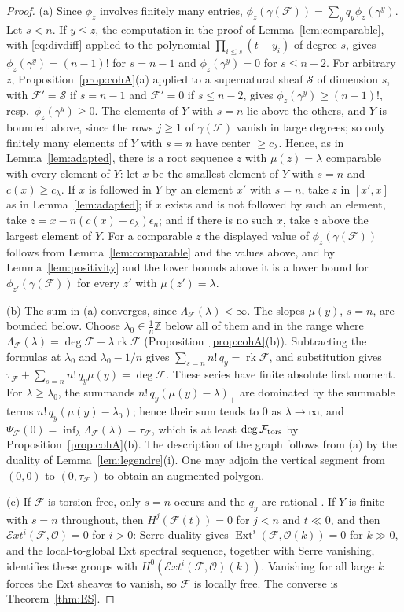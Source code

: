 \documentclass[11pt]{amsart}
\theoremstyle{definition}
\theoremstyle{remark}
\newcommand{\ZZ}{\mathbb{Z}}
\newcommand{\OO}{\mathcal{O}}
\newcommand{\cF}{\mathcal{F}}
\DeclareMathOperator{\rk}{rk}
\begin{document}
\begin{proof}
(a) Since $\phi_z$ involves finitely many entries, $\phi_z(\gamma(\cF))=\sum_yq_y\phi_z(\gamma^y)$. Let $s<n$. If $y\le z$, the computation in the proof of Lemma~\ref{lem:comparable}, with \eqref{eq:divdiff} applied to the polynomial $\prod_{i\le s}(t-y_i)$ of degree $s$, gives $\phi_z(\gamma^y)=(n-1)!$ for $s=n-1$ and $\phi_z(\gamma^y)=0$ for $s\le n-2$. For arbitrary $z$, Proposition~\ref{prop:cohA}(a) applied to a supernatural sheaf $\mathcal S$ of dimension $s$, with $\cF'=\mathcal S$ if $s=n-1$ and $\cF'=0$ if $s\le n-2$, gives $\phi_z(\gamma^y)\ge(n-1)!$, resp.\ $\phi_z(\gamma^y)\ge0$. The elements of $Y$ with $s=n$ lie above the others, and $Y$ is bounded above, since the rows $j\ge1$ of $\gamma(\cF)$ vanish in large degrees; so only finitely many elements of $Y$ with $s=n$ have center $\ge c_\lambda$. Hence, as in Lemma~\ref{lem:adapted}, there is a root sequence $z$ with $\mu(z)=\lambda$ comparable with every element of $Y$: let $x$ be the smallest element of $Y$ with $s=n$ and $c(x)\ge c_\lambda$. If $x$ is followed in $Y$ by an element $x'$ with $s=n$, take $z$ in $[x',x]$ as in Lemma~\ref{lem:adapted}; if $x$ exists and is not followed by such an element, take $z=x-n(c(x)-c_\lambda)\epsilon_n$; and if there is no such $x$, take $z$ above the largest element of $Y$. For a comparable $z$ the displayed value of $\phi_z(\gamma(\cF))$ follows from Lemma~\ref{lem:comparable} and the values above, and by Lemma~\ref{lem:positivity} and the lower bounds above it is a lower bound for $\phi_{z'}(\gamma(\cF))$ for every $z'$ with $\mu(z')=\lambda$.

(b) The sum in (a) converges, since $\Lambda_\cF(\lambda)<\infty$. The slopes $\mu(y)$, $s=n$, are bounded below. Choose $\lambda_0\in\frac1n\ZZ$ below all of them and in the range where $\Lambda_\cF(\lambda)=\deg\cF-\lambda\rk\cF$ (Proposition~\ref{prop:cohA}(b)). Subtracting the formulas at $\lambda_0$ and $\lambda_0-1/n$ gives $\sum_{s=n}n!\,q_y=\rk\cF$, and substitution gives $\tau_\cF+\sum_{s=n}n!\,q_y\mu(y)=\deg\cF$. These series have finite absolute first moment. For $\lambda\ge\lambda_0$, the summands $n!\,q_y(\mu(y)-\lambda)_+$ are dominated by the summable terms $n!\,q_y(\mu(y)-\lambda_0)$; hence their sum tends to $0$ as $\lambda\to\infty$, and $\Psi_\cF(0)=\inf_\lambda\Lambda_\cF(\lambda)=\tau_\cF$, which is at least $\deg\cF_{\rm tors}$ by Proposition~\ref{prop:cohA}(b). The description of the graph follows from (a) by the duality of Lemma~\ref{lem:legendre}(i). One may adjoin the vertical segment from $(0,0)$ to $(0,\tau_\cF)$ to obtain an augmented polygon.

(c) If $\cF$ is torsion-free, only $s=n$ occurs and the $q_y$ are rational \cite[Thm.~0.2]{ES10}. If $Y$ is finite with $s=n$ throughout, then $H^j(\cF(t))=0$ for $j<n$ and $t\ll0$, and then $\mathcal{E}xt^i(\cF,\OO)=0$ for $i>0$: Serre duality gives $\operatorname{Ext}^i(\cF,\OO(k))=0$ for $k\gg0$, and the local-to-global Ext spectral sequence, together with Serre vanishing, identifies these groups with $H^0(\mathcal{E}xt^i(\cF,\OO)(k))$. Vanishing for all large $k$ forces the Ext sheaves to vanish, so $\cF$ is locally free. The converse is Theorem~\ref{thm:ES}.
\end{proof}
\end{document}
